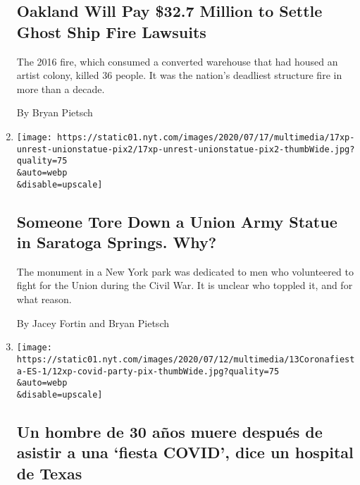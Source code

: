 \begin{enumerate}
  \hypertarget{oakland-will-pay-327-million-to-settle-ghost-ship-fire-lawsuits}{%
  \subsection{Oakland Will Pay \$32.7 Million to Settle Ghost Ship Fire
  Lawsuits}\label{oakland-will-pay-327-million-to-settle-ghost-ship-fire-lawsuits}}

  The 2016 fire, which consumed a converted warehouse that had housed an
  artist colony, killed 36 people. It was the nation's deadliest
  structure fire in more than a decade.

  By Bryan Pietsch
\item
  \href{/2020/07/18/us/union-statue-saratoga-springs-ny.html}{}

  \texttt{[image: https://static01.nyt.com/images/2020/07/17/multimedia/17xp-unrest-unionstatue-pix2/17xp-unrest-unionstatue-pix2-thumbWide.jpg?quality=75\\\&auto=webp\\\&disable=upscale]}

  \hypertarget{someone-tore-down-a-union-army-statue-in-saratoga-springs-why}{%
  \subsection{Someone Tore Down a Union Army Statue in Saratoga Springs.
  Why?}\label{someone-tore-down-a-union-army-statue-in-saratoga-springs-why}}

  The monument in a New York park was dedicated to men who volunteered
  to fight for the Union during the Civil War. It is unclear who toppled
  it, and for what reason.

  By Jacey Fortin and Bryan Pietsch
\item
  \href{/es/2020/07/13/espanol/mundo/fiesta-covid.html}{}

  \texttt{[image: https://static01.nyt.com/images/2020/07/12/multimedia/13Coronafiesta-ES-1/12xp-covid-party-pix-thumbWide.jpg?quality=75\\\&auto=webp\\\&disable=upscale]}

  \hypertarget{un-hombre-de-30-auxf1os-muere-despuuxe9s-de-asistir-a-una-fiesta-covid-dice-un-hospital-de-texas}{%
  \subsection{Un hombre de 30 años muere después de asistir a una
  `fiesta COVID', dice un hospital de
  Texas}\label{un-hombre-de-30-auxf1os-muere-despuuxe9s-de-asistir-a-una-fiesta-covid-dice-un-hospital-de-texas}}


\end{enumerate}
